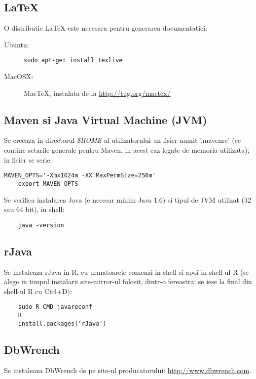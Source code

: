 \subsection{LaTeX}
O distributie LaTeX este necesara pentru generarea documentatiei:
\begin{description}
\item[Ubuntu:] 

\begin{lstlisting}[breaklines=true]
	sudo apt-get install texlive
\end{lstlisting}

\item[MacOSX:] 
MacTeX, instalata de la \url{http://tug.org/mactex/} 
\end{description}

\subsection{Maven si Java Virtual Machine (JVM)}
Se creeaza in directorul \emph{\$HOME} al utilizatorului un fisier numit
'.mavenrc' 
(ce contine setarile generale pentru Maven, in acest caz legate de memoria utilizata);
in fisier se scrie:
\begin{lstlisting}[breaklines=true]
	MAVEN_OPTS='-Xmx1024m -XX:MaxPermSize=256m'
	export MAVEN_OPTS
\end{lstlisting}

\label{java_version}
Se verifica instalarea Java (e necesar minim Java 1.6) si tipul de JVM
utilizat (32 sau 64 bit), in shell:
\begin{lstlisting}
	java -version
\end{lstlisting}

\subsection{rJava}
Se instaleaza rJava in R, cu urmatoarele comenzi in shell si apoi in shell-ul R
(se alege in timpul instalarii site-mirror-ul folosit, dintr-o fereastra;
se iese la final din shell-ul R cu Ctrl+D):
\begin{lstlisting}
	sudo R CMD javareconf
	R
	install.packages('rJava')
\end{lstlisting}

\subsection{DbWrench}
Se instaleaza DbWrench de pe site-ul producatorului:
\url{http://www.dbwrench.com}.


